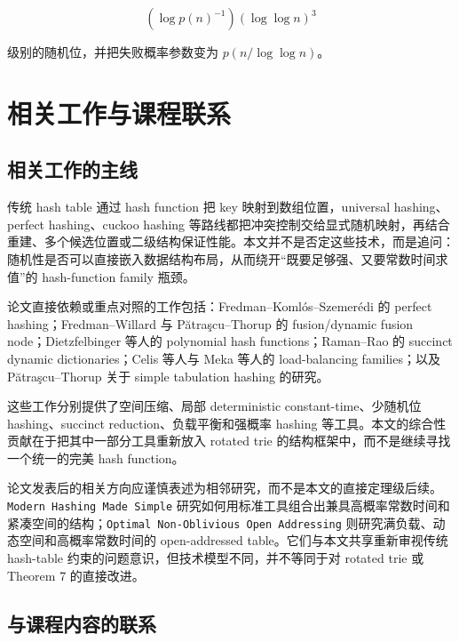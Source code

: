 \documentclass[12pt]{article}
\begin{document}
\[
(\log p(n)^{-1})(\log\log n)^3
\]

级别的随机位，并把失败概率参数变为 \(p(n/\log\log n)\)\cite[Theorem~7]{kuszmaul2022}。

\section{相关工作与课程联系}

\subsection{相关工作的主线}

传统 hash table 通过 hash function 把 key 映射到数组位置，universal hashing、perfect hashing、cuckoo hashing 等路线都把冲突控制交给显式随机映射，再结合重建、多个候选位置或二级结构保证性能\cite{carter1979,fks1982,pagh2004}。本文并不是否定这些技术，而是追问：随机性是否可以直接嵌入数据结构布局，从而绕开“既要足够强、又要常数时间求值”的 hash-function family 瓶颈\cite[Secs.~1 and 3]{kuszmaul2022}。

论文直接依赖或重点对照的工作包括：Fredman--Komlós--Szemerédi 的 perfect hashing\cite{fks1982}；Fredman--Willard 与 Pătraşcu--Thorup 的 fusion/dynamic fusion node\cite{fredman1990,patrascu2014}；Dietzfelbinger 等人的 polynomial hash functions\cite{dietzfelbinger1992}；Raman--Rao 的 succinct dynamic dictionaries\cite{raman2003}；Celis 等人与 Meka 等人的 load-balancing families\cite{celis2011,meka2014}；以及 Pătraşcu--Thorup 关于 simple tabulation hashing 的研究\cite{patrascu2012}。

这些工作分别提供了空间压缩、局部 deterministic constant-time、少随机位 hashing、succinct reduction、负载平衡和强概率 hashing 等工具。本文的综合性贡献在于把其中一部分工具重新放入 rotated trie 的结构框架中，而不是继续寻找一个统一的完美 hash function。

论文发表后的相关方向应谨慎表述为相邻研究，而不是本文的直接定理级后续。\texttt{Modern Hashing Made Simple} 研究如何用标准工具组合出兼具高概率常数时间和紧凑空间的结构\cite{bender2024}；\texttt{Optimal Non-Oblivious Open Addressing} 则研究满负载、动态空间和高概率常数时间的 open-addressed table\cite{bender2025}。它们与本文共享重新审视传统 hash-table 约束的问题意识，但技术模型不同，并不等同于对 rotated trie 或 Theorem 7 的直接改进。

\subsection{与课程内容的联系}
\end{document}
